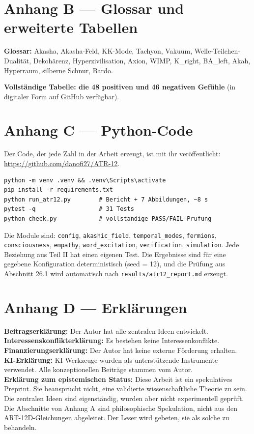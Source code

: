 \documentclass[11pt,a4paper]{article}
\begin{document}
\section{Anhang B --- Glossar und erweiterte Tabellen}
\textbf{Glossar:} Akasha, Akasha-Feld, KK-Mode, Tachyon, Vakuum, Welle-Teilchen-Dualität, Dekohärenz, Hyperzivilisation, Axion, WIMP, K\_right, BA\_left, Akah, Hyperraum, silberne Schnur, Bardo.

\textbf{Vollständige Tabelle: die 48 positiven und 46 negativen Gefühle} (in digitaler Form auf GitHub verfügbar).

\section{Anhang C --- Python-Code}
Der Code, der jede Zahl in der Arbeit erzeugt, ist mit ihr veröffentlicht: \url{https://github.com/danofi27/ATR-12}.

\begin{verbatim}
python -m venv .venv && .venv\Scripts\activate
pip install -r requirements.txt
python run_atr12.py        # Bericht + 7 Abbildungen, ~8 s
pytest -q                  # 31 Tests
python check.py            # vollstandige PASS/FAIL-Prufung
\end{verbatim}

Die Module sind: \texttt{config}, \texttt{akashic\_field}, \texttt{temporal\_modes}, \texttt{fermions}, \texttt{consciousness}, \texttt{empathy}, \texttt{word\_excitation}, \texttt{verification}, \texttt{simulation}. Jede Beziehung aus Teil II hat einen eigenen Test. Die Ergebnisse sind für eine gegebene Konfiguration deterministisch (seed = 12), und die Prüfung aus Abschnitt 26.1 wird automatisch nach \texttt{results/atr12\_report.md} erzeugt.

\section{Anhang D --- Erklärungen}
\textbf{Beitragserklärung:} Der Autor hat alle zentralen Ideen entwickelt. \\
\textbf{Interessenskonflikterklärung:} Es bestehen keine Interessenkonflikte. \\
\textbf{Finanzierungserklärung:} Der Autor hat keine externe Förderung erhalten. \\
\textbf{KI-Erklärung:} KI-Werkzeuge wurden als unterstützende Instrumente verwendet. Alle konzeptionellen Beiträge stammen vom Autor. \\
\textbf{Erklärung zum epistemischen Status:} Diese Arbeit ist ein spekulatives Preprint. Sie beansprucht nicht, eine validierte wissenschaftliche Theorie zu sein. Die zentralen Ideen sind eigenständig, wurden aber nicht experimentell geprüft. Die Abschnitte von Anhang A sind philosophische Spekulation, nicht aus den ART-12D-Gleichungen abgeleitet. Der Leser wird gebeten, sie als solche zu behandeln.
\end{document}
